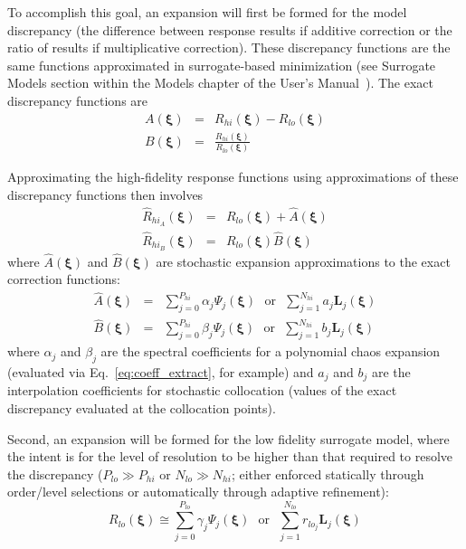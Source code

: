 To accomplish this goal, an expansion will first be formed for the
model discrepancy (the difference between response results if additive
correction or the ratio of results if multiplicative correction).
These discrepancy functions are the same functions approximated in
surrogate-based minimization (see Surrogate Models section within the
Models chapter of the User's Manual~\cite{UserMan}).  The exact
discrepancy functions are
\begin{eqnarray}
A(\boldsymbol{\xi}) & = & R_{hi}(\boldsymbol{\xi}) - R_{lo}(\boldsymbol{\xi})
\label{eq:exact_A} \\
B(\boldsymbol{\xi}) & = & 
\frac{R_{hi}(\boldsymbol{\xi})}{R_{lo}(\boldsymbol{\xi})} \label{eq:exact_B}
\end{eqnarray}

Approximating the high-fidelity response functions using approximations of
these discrepancy functions then involves
\begin{eqnarray}
\hat{R}_{hi_A}(\boldsymbol{\xi}) & = & R_{lo}(\boldsymbol{\xi}) + 
\hat{A}(\boldsymbol{\xi}) \label{eq:correct_val_add} \\
\hat{R}_{hi_B}(\boldsymbol{\xi}) & = & 
R_{lo}(\boldsymbol{\xi}) \hat{B}(\boldsymbol{\xi}) \label{eq:correct_val_mult}
\end{eqnarray}
where $\hat{A}(\boldsymbol{\xi})$ and $\hat{B}(\boldsymbol{\xi})$ are 
stochastic expansion approximations to the exact correction functions:
\begin{eqnarray}
\hat{A}(\boldsymbol{\xi}) & = & 
\sum_{j=0}^{P_{hi}} \alpha_j \Psi_j(\boldsymbol{\xi}) ~~~\text{or}~~~ 
\sum_{j=1}^{N_{hi}} a_j \boldsymbol{L}_j(\boldsymbol{\xi}) \label{eq:stoch_exp_A} \\
\hat{B}(\boldsymbol{\xi}) & = &  
\sum_{j=0}^{P_{hi}} \beta_j \Psi_j(\boldsymbol{\xi}) ~~~\text{or}~~~ 
\sum_{j=1}^{N_{hi}} b_j \boldsymbol{L}_j(\boldsymbol{\xi}) \label{eq:stoch_exp_B}
\end{eqnarray}
where $\alpha_j$ and $\beta_j$ are the spectral coefficients for a
polynomial chaos expansion (evaluated via Eq.~\ref{eq:coeff_extract},
for example) and $a_j$ and $b_j$ are the interpolation coefficients
for stochastic collocation (values of the exact discrepancy evaluated
at the collocation points).

Second, an expansion will be formed for the low fidelity surrogate
model, where the intent is for the level of resolution to be higher
than that required to resolve the discrepancy ($P_{lo} \gg P_{hi}$ or
$N_{lo} \gg N_{hi}$; either enforced statically through order/level
selections or automatically through adaptive refinement):
\begin{equation}
R_{lo}(\boldsymbol{\xi}) \cong
\sum_{j=0}^{P_{lo}} \gamma_j \Psi_j(\boldsymbol{\xi}) ~~~\text{or}~~~ 
\sum_{j=1}^{N_{lo}} r_{lo_j} \boldsymbol{L}_j(\boldsymbol{\xi}) 
\label{eq:stoch_exp_LF}
\end{equation}

